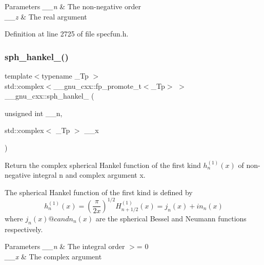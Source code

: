 \begin{DoxyParams}{Parameters}
{\em \+\_\+\+\_\+n} & The non-\/negative order \\
\hline
{\em \+\_\+\+\_\+z} & The real argument \\
\hline
\end{DoxyParams}


Definition at line 2725 of file specfun.\+h.

\mbox{\label{group__mathsf__gnu_ga3d256857c000a966e89526cb99253aca}} 
\subsubsection{\texorpdfstring{sph\+\_\+hankel\+\_()}{sph\_hankel\_1()}\hspace{0.1cm}{\footnotesize\ttfamily [2/2]}}
{\footnotesize\ttfamily template$<$typename \+\_\+\+Tp $>$ \\
std\+::complex$<$\+\_\+\+\_\+gnu\+\_\+cxx\+::fp\+\_\+promote\+\_\+t$<$\+\_\+\+Tp$>$ $>$ \+\_\+\+\_\+gnu\+\_\+cxx\+::sph\+\_\+hankel\+\_ (\begin{DoxyParamCaption}\item[{unsigned int}]{\+\_\+\+\_\+n,  }\item[{std\+::complex$<$ \+\_\+\+Tp $>$}]{\+\_\+\+\_\+x }\end{DoxyParamCaption})\hspace{0.3cm}{\ttfamily [inline]}}

Return the complex spherical Hankel function of the first kind $ h^{(1)}_n(x) $ of non-\/negative integral {\ttfamily n} and complex argument {\ttfamily x}.

The spherical Hankel function of the first kind is defined by \[ h^{(1)}_n(x) = \left(\frac{\pi}{2x} \right) ^{1/2} H^{(1)}_{n+1/2}(x) = j_n(x) + i n_n(x) \] where $ j_n(x) @c and n_n(x) $ are the spherical Bessel and Neumann functions respectively.


\begin{DoxyParams}{Parameters}
{\em \+\_\+\+\_\+n} & The integral order $>$= 0 \\
\hline
{\em \+\_\+\+\_\+x} & The complex argument \\
\hline
\end{DoxyParams}



